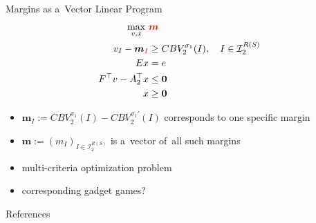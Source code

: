 \documentclass{beamer}
\theoremstyle{definition}
\newcommand{\vect}[1]{\boldsymbol{#1}}
\newcommand{\I}{\mathcal{I}}
\begin{document}
  \begin{frame}{Margins as a~Vector Linear Program}
    \begin{equation*}
      \label{vlp:max-margins}
      \begin{split}
        \max_{v, x}\ &\textcolor{red}{\vect{m}} \\
        v_I - \vect{m}_{\textcolor{red}{I}} &\ge CBV_2^{\sigma_1}(I), \quad I \in \I_2^{R(S)}\\ 
        Ex &= e \\
        F^\top v - A_2^\top x &\le \vect{0} \\
        x &\ge \vect{0}
      \end{split}
    \end{equation*}

    \pause
    \begin{itemize}[<+- | alert@+>]
      \item $\vect{m}_I := CBV_2^{\sigma_1} (I) - CBV_2^{\sigma_1'} (I)$ corresponds to one specific margin
      \item $\vect{m} := (m_I) _{I\in\I_2^{R(S)}}$ is a~vector of~all such margins
      \item multi-criteria optimization problem
      \item corresponding gadget games?
    \end{itemize}
  \end{frame}

  \begin{frame}[allowframebreaks]{References}
    \tiny
    \printbibliography[heading=none]
  \end{frame}
\end{document}
